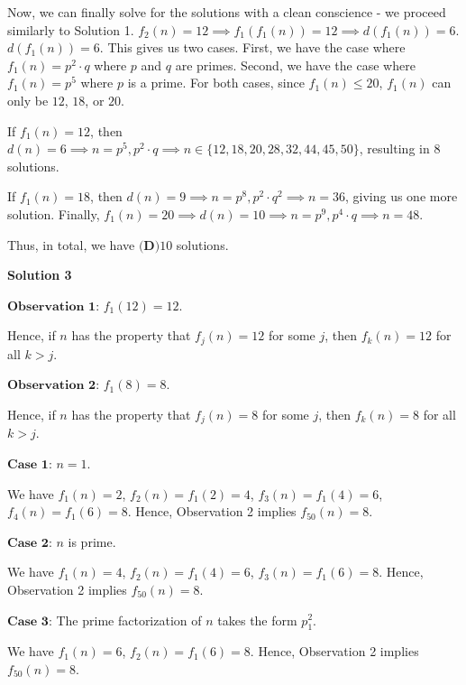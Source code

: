 \begin{enumerate}
 Now, we can finally solve for the solutions with a clean conscience - we proceed similarly to Solution 1. $f_2(n) = 12 \implies f_1(f_1(n)) = 12 \implies d(f_1(n)) = 6$. $d(f_1(n)) = 6$. This gives us two cases. First, we have the case where $f_1(n) = p^2 \cdot q$ where $p$ and $q$ are primes. Second, we have the case where $f_1(n)=p^5$ where $p$ is a prime.  For both cases, since $f_1(n) \le 20$, $f_1(n)$ can only be $12$, $18$, or $20$.

 If $f_1(n) = 12$, then $d(n) = 6 \implies n = p^5, p^2 \cdot q \implies n \in \{ 12, 18, 20, 28, 32, 44, 45, 50 \}$, resulting in 8 solutions. 

 If $f_1(n) = 18$, then $d(n) = 9 \implies n = p^8, p^2 \cdot q^2 \implies n = 36$, giving us one more solution. Finally, $f_1(n) = 20 \implies d(n) = 10 \implies n = p^9, p^4 \cdot q \implies n = 48$. 

 Thus, in total, we have $\boxed{\textbf{(D)} 10}$ solutions.

 



\textbf{Solution 3}

$\textbf{Observation 1}$: $f_1 \left( 12 \right) = 12$.

 Hence, if $n$ has the property that $f_j \left( n \right) = 12$ for some $j$, then $f_k \left( n \right) = 12$ for all $k > j$.

 $\textbf{Observation 2}$: $f_1 \left( 8 \right) = 8$.

 Hence, if $n$ has the property that $f_j \left( n \right) = 8$ for some $j$, then $f_k \left( n \right) = 8$ for all $k > j$.

 $\textbf{Case 1}$: $n = 1$.

 We have $f_1 \left( n \right) = 2$, $f_2 \left( n \right) = f_1 \left( 2 \right) = 4$, $f_3 \left( n \right) = f_1 \left( 4 \right) = 6$, $f_4 \left( n \right) = f_1 \left( 6 \right) = 8$. Hence, Observation 2 implies $f_{50} \left( n \right) = 8$.

 $\textbf{Case 2}$: $n$ is prime.

 We have $f_1 \left( n \right) = 4$, $f_2 \left( n \right) = f_1 \left( 4 \right) = 6$, $f_3 \left( n \right) = f_1 \left( 6 \right) = 8$. Hence, Observation 2 implies $f_{50} \left( n \right) = 8$.

 $\textbf{Case 3}$: The prime factorization of $n$ takes the form $p_1^2$.

 We have $f_1 \left( n \right) = 6$, $f_2 \left( n \right) = f_1 \left( 6 \right) = 8$. Hence, Observation 2 implies $f_{50} \left( n \right) = 8$.


\end{enumerate}
